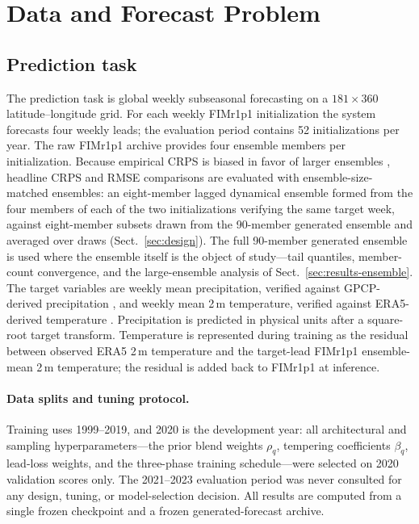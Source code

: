 \documentclass[11pt]{article}
\newcommand{\modelshort}{FIMr1p1}
\begin{document}
\section{Data and Forecast Problem}
\label{sec:data}

\subsection{Prediction task}

The prediction task is global weekly subseasonal forecasting on a $181\times360$ latitude--longitude grid. For each weekly \modelshort{} initialization the system forecasts four weekly leads; the evaluation period contains 52 initializations per year. The raw \modelshort{} archive provides four ensemble members per initialization. Because empirical CRPS is biased in favor of larger ensembles \citep{Ferro2014}, headline CRPS and RMSE comparisons are evaluated with ensemble-size-matched ensembles: an eight-member lagged dynamical ensemble formed from the four members of each of the two initializations verifying the same target week, against eight-member subsets drawn from the 90-member generated ensemble and averaged over draws (Sect.~\ref{sec:design}). The full 90-member generated ensemble is used where the ensemble itself is the object of study---tail quantiles, member-count convergence, and the large-ensemble analysis of Sect.~\ref{sec:results-ensemble}. The target variables are weekly mean precipitation, verified against GPCP-derived precipitation \citep{Adler2003}, and weekly mean 2\,m temperature, verified against ERA5-derived temperature \citep{Hersbach2020}. Precipitation is predicted in physical units after a square-root target transform. Temperature is represented during training as the residual between observed ERA5 2\,m temperature and the target-lead \modelshort{} ensemble-mean 2\,m temperature; the residual is added back to \modelshort{} at inference.

\paragraph{Data splits and tuning protocol.} Training uses 1999--2019, and 2020 is the development year: all architectural and sampling hyperparameters---the prior blend weights $\rho_q$, tempering coefficients $\beta_q$, lead-loss weights, and the three-phase training schedule---were selected on 2020 validation scores only. The 2021--2023 evaluation period was never consulted for any design, tuning, or model-selection decision. All results are computed from a single frozen checkpoint and a frozen generated-forecast archive.
\end{document}
